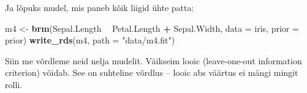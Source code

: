 \documentclass[]{book}
\newenvironment{Shaded}{\begin{snugshade}}{\end{snugshade}}
\newcommand{\KeywordTok}[1]{\textcolor[rgb]{0.13,0.29,0.53}{\textbf{#1}}}
\newcommand{\DataTypeTok}[1]{\textcolor[rgb]{0.13,0.29,0.53}{#1}}
\newcommand{\StringTok}[1]{\textcolor[rgb]{0.31,0.60,0.02}{#1}}
\newcommand{\OperatorTok}[1]{\textcolor[rgb]{0.81,0.36,0.00}{\textbf{#1}}}
\newcommand{\NormalTok}[1]{#1}
\begin{document}
Ja lõpuks mudel, mis paneb kõik liigid ühte patta:

\begin{Shaded}
\begin{Highlighting}[]
\NormalTok{m4 <-}\StringTok{ }\KeywordTok{brm}\NormalTok{(Sepal.Length }\OperatorTok{~}\StringTok{ }\NormalTok{Petal.Length }\OperatorTok{+}\StringTok{ }\NormalTok{Sepal.Width, }
          \DataTypeTok{data =}\NormalTok{ iris, }
          \DataTypeTok{prior =}\NormalTok{ prior)}
\KeywordTok{write_rds}\NormalTok{(m4, }\DataTypeTok{path =} \StringTok{"data/m4.fit"}\NormalTok{)}
\end{Highlighting}
\end{Shaded}

Siin me võrdleme neid nelja mudelit. Väikseim looic (leave-one-out
information criterion) võidab. See on suhteline võrdlus -- looic abs
väärtus ei mängi mingit rolli.
\end{document}
